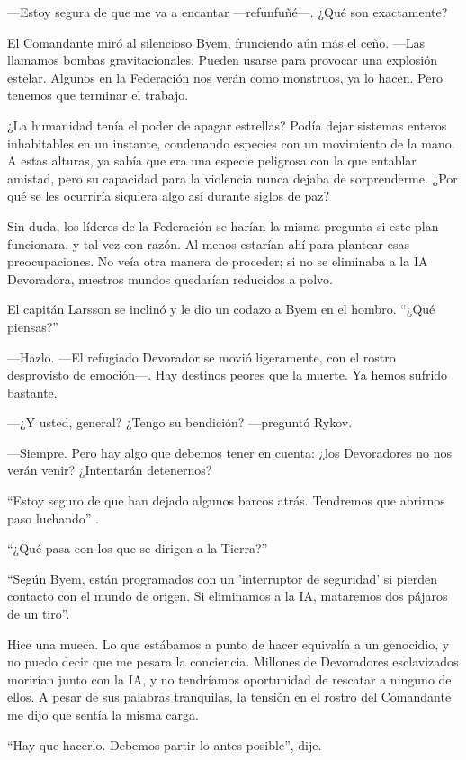 —Estoy segura de que me va a encantar —refunfuñé—. ¿Qué son exactamente?

El Comandante miró al silencioso Byem, frunciendo aún más el ceño. —Las llamamos bombas gravitacionales. Pueden usarse para provocar una explosión estelar. Algunos en la Federación nos verán como monstruos, ya lo hacen. Pero tenemos que terminar el trabajo.

¿La humanidad tenía el poder de apagar estrellas? Podía dejar sistemas enteros inhabitables en un instante, condenando especies con un movimiento de la mano. A estas alturas, ya sabía que era una especie peligrosa con la que entablar amistad, pero su capacidad para la violencia nunca dejaba de sorprenderme. ¿Por qué se les ocurriría siquiera algo así durante siglos de paz?

Sin duda, los líderes de la Federación se harían la misma pregunta si este plan funcionara, y tal vez con razón. Al menos estarían ahí para plantear esas preocupaciones. No veía otra manera de proceder; si no se eliminaba a la IA Devoradora, nuestros mundos quedarían reducidos a polvo.

El capitán Larsson se inclinó y le dio un codazo a Byem en el hombro. ``¿Qué piensas?''


—Hazlo. —El refugiado Devorador se movió ligeramente, con el rostro desprovisto de emoción—. Hay destinos peores que la muerte. Ya hemos sufrido bastante.

—¿Y usted, general? ¿Tengo su bendición? —preguntó Rykov.

—Siempre. Pero hay algo que debemos tener en cuenta: ¿los Devoradores no nos verán venir? ¿Intentarán detenernos?

``Estoy seguro de que han dejado algunos barcos atrás. Tendremos que abrirnos paso luchando''
.

``¿Qué pasa con los que se dirigen a la Tierra?''


``Según Byem, están programados con un 'interruptor de seguridad' si pierden contacto con el mundo de origen. Si eliminamos a la IA, mataremos dos pájaros de un tiro''.

Hice una mueca. Lo que estábamos a punto de hacer equivalía a un genocidio, y no puedo decir que me pesara la conciencia. Millones de Devoradores esclavizados morirían junto con la IA, y no tendríamos oportunidad de rescatar a ninguno de ellos. A pesar de sus palabras tranquilas, la tensión en el rostro del Comandante me dijo que sentía la misma carga.

``Hay que hacerlo. Debemos partir lo antes posible'', dije.

